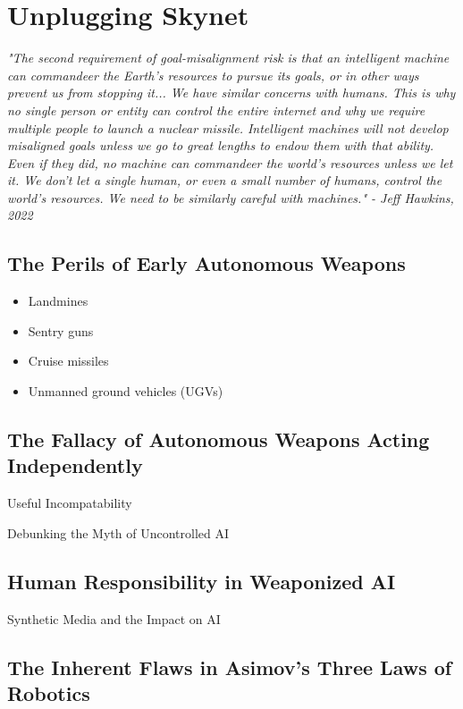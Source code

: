 \setchapterpreamble[u]{\margintoc}
\chapter{Unplugging Skynet}

\textit{"The second requirement of goal-misalignment risk is that an intelligent machine can commandeer the Earth's resources to pursue its goals, or in other ways prevent us from stopping it... We have similar concerns with humans. This is why no single person or entity can control the entire internet and why we require multiple people to launch a nuclear missile. Intelligent machines will not develop misaligned goals unless we go to great lengths to endow them with that ability. Even if they did, no machine can commandeer the world's resources unless we let it. We don't let a single human, or even a small number of humans, control the world's resources. We need to be similarly careful with machines." - Jeff Hawkins, 2022 \cite{hawkins2022}}

\section{The Perils of Early Autonomous Weapons}
\begin{itemize}
\item Landmines
\item Sentry guns
\item Cruise missiles
\item Unmanned ground vehicles (UGVs)
\end{itemize}

\section{The Fallacy of Autonomous Weapons Acting Independently}

Useful Incompatability

Debunking the Myth of Uncontrolled AI

\section{Human Responsibility in Weaponized AI}

Synthetic Media and the Impact on AI \cite{syntheticmedia}

\section{The Inherent Flaws in Asimov's Three Laws of Robotics}

